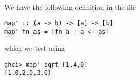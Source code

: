 
We have the following definition in the file 
\begin{verbatim}
map' :: (a -> b) -> [a] -> [b]
map' fn as = [fn a | a <- as]
\end{verbatim}
which we test using
\begin{verbatim}
ghci> map' sqrt [1,4,9]
[1.0,2.0,3.0]
\end{verbatim}
